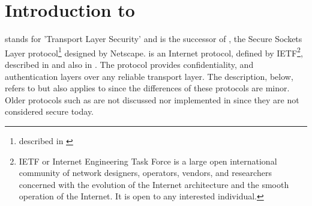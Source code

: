 \chapter{Introduction to \tls{}}

\label{sec:tlsintro}
\tls{} stands for 'Transport Layer Security' and is the successor of \ssl{},
the Secure Sockets Layer protocol\footnote{described in \cite{SSL3}} designed by Netscape. 
\tlsI{} is an Internet protocol,
defined by {IETF}\footnote{IETF or Internet Engineering Task Force 
is a large open international community of network
designers, operators, vendors, and researchers concerned with the evolution of 
the Internet architecture and the smooth operation of the Internet. It is open 
to any interested individual.}, described in \cite{RFC2246} and
also in \cite{RESCOLA}. The protocol provides confidentiality, and 
authentication layers over any reliable transport layer. The description, 
below, refers to \tlsI{} but also applies to \sslIII{} since the differences 
of these protocols are minor. Older protocols such as \sslII{} are not 
discussed nor implemented in \gnutls{} since they are not considered secure 
today.












